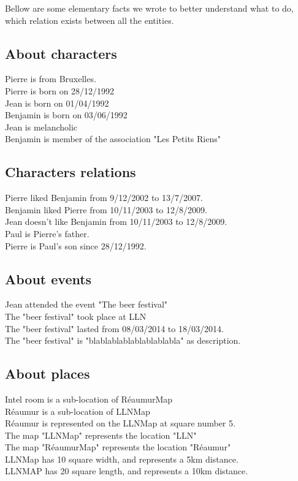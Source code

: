 \documentclass[a4paper ,12pt,french]{article}
\begin{document}
Bellow are some elementary facts we wrote to better understand what to do, which relation exists between all the entities.

\subsection{About characters}

\noindent Pierre is from Bruxelles.\\
Pierre is born on 28/12/1992\\
Jean is born on 01/04/1992\\
Benjamin is born on 03/06/1992\\
Jean is melancholic\\
Benjamin is member of the association "Les Petits Riens"

\subsection{Characters relations}
\noindent Pierre liked Benjamin from 9/12/2002 to 13/7/2007.\\
Benjamin liked Pierre from 10/11/2003 to 12/8/2009.\\
Jean doesn't like Benjamin from 10/11/2003 to 12/8/2009.\\
Paul is Pierre's father.\\
Pierre is Paul's son since 28/12/1992.\\


\subsection{About events}

\noindent Jean attended the event "The beer festival"\\
The "beer festival" took place at LLN\\
The "beer festival" lasted from 08/03/2014 to 18/03/2014.\\
The "beer festival" is "blablablablablablablabla" as description.


\subsection{About places}
\noindent Intel room is a sub-location of RéaumurMap\\
Réaumur is a sub-location of LLNMap\\
Réaumur is represented on the LLNMap at square number 5.\\
The map "LLNMap" represents the location "LLN"\\
The map "RéaumurMap" represents the location "Réaumur"\\
LLNMap has 10 square width, and represents a 5km distance.\\
LLNMAP has 20 square length, and represents a 10km distance.
\end{document}
